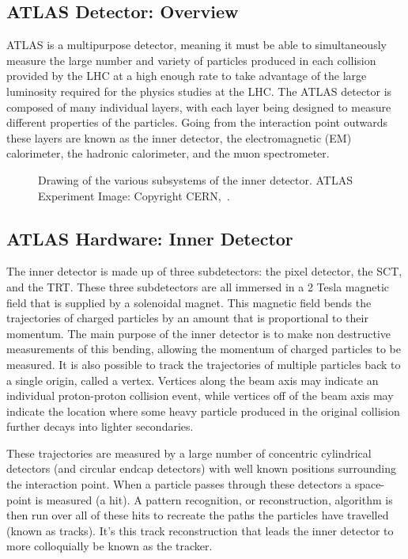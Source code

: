 \subsection{ATLAS Detector: Overview}

ATLAS is a multipurpose detector, meaning it must be able to simultaneously measure the large number and variety of particles produced in each collision provided by the LHC at a high enough rate to take advantage of the large luminosity required for the physics studies at the LHC. 
The ATLAS detector is composed of many individual layers, with each layer being designed to measure different properties of the particles.  
Going from the interaction point outwards these layers are known as the inner detector, the electromagnetic (EM) calorimeter, the hadronic calorimeter, and the muon spectrometer.   

\begin{figure}[!ht]
  \begin{center}
  \end{center}
  \caption[Layout of the ATLAS Inner Detector]
  {\small Drawing of the various subsystems of the inner detector.  ATLAS Experiment Image: Copyright CERN,~\cite{Pequenao:1095926}.}
\end{figure}

\subsection{ATLAS Hardware: Inner Detector}
\label{Sec.ID}
The inner detector is made up of three subdetectors: the pixel detector, the \gls{SCT}, and the \gls{TRT}.  
These three subdetectors are all immersed in a 2 Tesla magnetic field that is supplied by a solenoidal magnet.  
This magnetic field bends the trajectories of charged particles by an amount that is proportional to their momentum.  
The main purpose of the inner detector is to make non destructive measurements of this bending, allowing the momentum of charged particles to be measured.  
It is also possible to track the trajectories of multiple particles back to a single origin, called a vertex.  
Vertices along the beam axis may indicate an individual proton-proton collision event, while vertices off of the beam axis may indicate the location where some heavy particle produced in the original collision further decays into lighter secondaries.  
 
These trajectories are measured by a large number of concentric cylindrical detectors (and circular endcap detectors)  with well known positions surrounding the interaction point.  
When a particle passes through these detectors a space-point is measured (a hit).  
A pattern recognition, or reconstruction, algorithm is then run over all of these hits to recreate the paths the particles have travelled (known as tracks).  
It's this track reconstruction that leads the inner detector to more colloquially be known as the tracker.  

